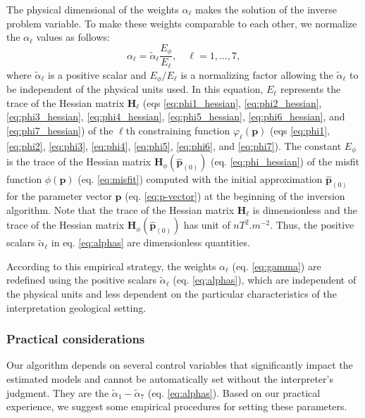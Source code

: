 The physical dimensional of the weights $ \alpha_{\ell}$ makes the solution of the inverse problem variable. 
To make these weights comparable to each other, we normalize the $ \alpha_{\ell} $ 
values as follows:
\begin{equation}\label{eq:alphas}
\alpha_{\ell} = \tilde{\alpha}_\ell \frac{E_\phi}{E_\ell}, \quad \ell = 1,\dots, 7,
\end{equation}
where $\tilde{\alpha}_\ell$ is a positive scalar and $ E_\phi/E_\ell $ is a normalizing
factor allowing the $\tilde{\alpha}_\ell$ to be independent of the physical units used.
In this equation, $ E_\ell $ represents the 
trace of the Hessian matrix $\mathbf{H}_{\ell}$ (eqs \ref{eq:phi1_hessian}, 
\ref{eq:phi2_hessian}, \ref{eq:phi3_hessian}, \ref{eq:phi4_hessian}, \ref{eq:phi5_hessian}, 
\ref{eq:phi6_hessian}, and \ref{eq:phi7_hessian}) of the $\ell$th constraining function 
$\varphi_{\ell}(\mathbf{p})$ (eqs \ref{eq:phi1}, \ref{eq:phi2}, \ref{eq:phi3}, 
\ref{eq:phi4}, \ref{eq:phi5}, \ref{eq:phi6}, and \ref{eq:phi7}). 
The constant $E_\phi$ is the trace of the Hessian matrix 
$\mathbf{H}_{\phi}(\hat{\mathbf{p}}_{(0)})$ (eq. \ref{eq:phi_hessian}) of the misfit function 
$\phi(\mathbf{p})$ (eq. \ref{eq:misfit}) computed with the initial approximation $\hat{\mathbf{p}}_{(0)}$ 
for the parameter vector $ \mathbf{p} $ (eq. \ref{eq:p-vector}) at the beginning of the inversion algorithm. 
Note that the trace of the Hessian matrix $\mathbf{H}_{\ell}$ is dimensionless and 
the trace of the Hessian matrix $\mathbf{H}_{\phi}(\hat{\mathbf{p}}_{(0)})$ has unit of $nT^{2}.m^{-2}$.
Thus, the positive scalars $\tilde{\alpha}_\ell$ in eq. \ref{eq:alphas} are dimensionless quantities.

According to this empirical strategy, the weights $ \alpha_{\ell} $ 
(eq. \ref{eq:gamma}) are redefined using the positive scalars $\tilde{\alpha}_\ell$ 
(eq. \ref{eq:alphas}), which are independent of the physical units and less dependent 
on the particular characteristics of the interpretation geological setting.


\subsubsection{Practical considerations}

Our algorithm depends on several control variables that significantly impact the estimated models and cannot be automatically set without the interpreter’s judgment. 
They are the $\tilde{\alpha}_1 - \tilde{\alpha}_7$ (eq. \ref{eq:alphas}). 
Based on our practical experience, we suggest some 
empirical procedures for setting these parameters.

